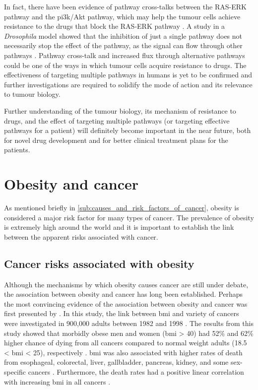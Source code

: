 In fact, there have been evidence of pathway cross-talks between the RAS-ERK pathway and the \gls{pi3k}/Akt pathway, which may help the tumour cells achieve resistance to the  drugs that block the RAS-ERK pathway \citep{Moelling2002,Zimmermann1999a}.
A study in a \textit{Drosophila} model showed that the inhibition of just a single pathway does not necessarily stop the effect of the pathway, as the signal can flow through other pathways \citep{Dar2012}.
Pathway cross-talk and increased flux through alternative pathways could be one of the ways in which tumour cells acquire resistance to drugs.
The effectiveness of targeting multiple pathways in humans is yet to be confirmed and further investigations are required to solidify the mode of action and its relevance to tumour biology.

Further understanding of the tumour biology, its mechanism of resistance to drugs, and the effect of targeting multiple pathways (or targeting effective pathways for a patient) will definitely become important in the near future, both for novel drug development and for better clinical treatment plans for the patients.

\section{Obesity and cancer}
\label{sec:obesity_and_cancer}

As mentioned briefly in \cref{sub:causes_and_risk_factors_of_cancer}, obesity is considered a major risk factor for many types of cancer.
The prevalence of obesity is extremely high around the world and  it is important to establish the link between the apparent risks associated with cancer.

\subsection{Cancer risks associated with obesity}
\label{sub:cancer_risks_associated_with_obesity}

Although the mechanisms by which obesity causes cancer are still under debate, the association between obesity and cancer has long been established.
Perhaps the most convincing evidence of the association between obesity and cancer was first presented by \citet{Calle2003}.
In this study, the link between \gls{bmi} and variety of cancers were investigated in 900,000 adults between 1982 and 1998 \citep{Calle2003}.
The results from this study showed that morbidly obese men and women (\gls{bmi} \textgreater{} 40) had 52\% and 62\% higher chance of dying from all cancers compared to normal weight adults (18.5 \textless{} \gls{bmi} \textless{} 25), respectively \citep{Calle2003}.
\gls{bmi} was also associated with higher rates of death from esophageal, colorectal, liver, gallbladder, pancreas, kidney, and some sex-specific cancers \citep{Calle2003}.
Furthermore, the death rates had a positive linear correlation with increasing \gls{bmi} in all cancers \citep{Calle2003}.

